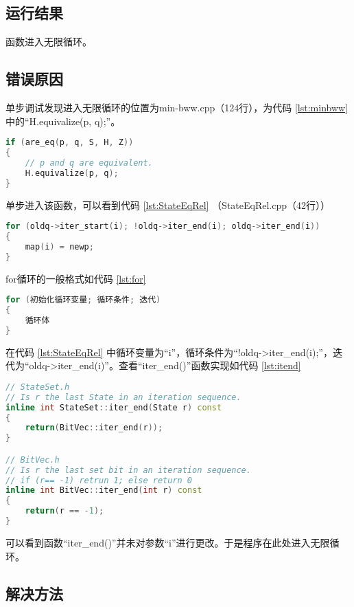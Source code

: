 \subsection{运行结果}
函数进入无限循环。

\subsection{错误原因} 

单步调试发现进入无限循环的位置为min-bww.cpp（124行），为代码 \ref{lst:minbww} 中的“H.equivalize(p, q);”。
\lstset{style=mystyle}
\begin{lstlisting}[language=C++,label={lst:minbww},caption={min-bww.cpp}]
if (are_eq(p, q, S, H, Z))
{
    // p and q are equivalent.
    H.equivalize(p, q);
}
\end{lstlisting}
单步进入该函数，可以看到代码 \ref{lst:StateEqRel} （StateEqRel.cpp（42行））
\lstset{style=mystyle}
\begin{lstlisting}[language=C++,label={lst:StateEqRel},caption={StateEqRel.cpp}]
for (oldq->iter_start(i); !oldq->iter_end(i); oldq->iter_end(i))
{
    map(i) = newp;
}
\end{lstlisting}
for循环的一般格式如代码 \ref{lst:for}
\lstset{style=mystyle}
\begin{lstlisting}[language=C++,label={lst:for},caption={for 循环的一般格式}]
for (初始化循环变量; 循环条件; 迭代)
{
    循环体
}
\end{lstlisting}
在代码 \ref{lst:StateEqRel} 中循环变量为“i”，循环条件为“!oldq->iter\_end(i);”，迭代为“oldq->iter\_end(i)”。查看“iter\_end()”函数实现如代码 \ref{lst:itend}
\lstset{style=mystyle}
\begin{lstlisting}[language=C++,label={lst:itend},caption={函数 iter\_end() 的实现}]
// StateSet.h
// Is r the last State in an iteration sequence.
inline int StateSet::iter_end(State r) const
{
	return(BitVec::iter_end(r));
}

// BitVec.h
// Is r the last set bit in an iteration sequence.
// if (r== -1) retrun 1; else return 0
inline int BitVec::iter_end(int r) const
{
	return(r == -1);
}
\end{lstlisting}
可以看到函数“iter\_end()”并未对参数“i”进行更改。于是程序在此处进入无限循环。

\subsection{解决方法}

